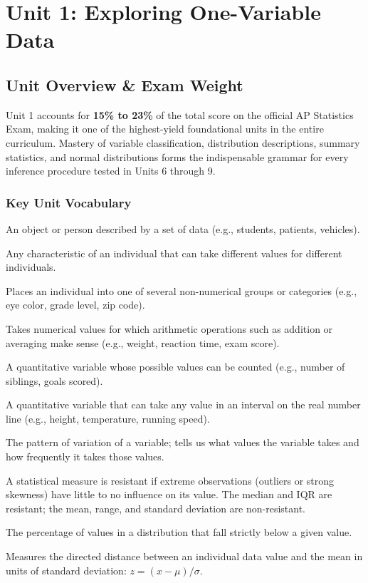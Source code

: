 ﻿%
\chapter{Unit 1: Exploring One-Variable Data}

\section{Unit Overview \& Exam Weight}
Unit 1 accounts for \textbf{15\% to 23\%} of the total score on the official AP Statistics Exam, making it one of the highest-yield foundational units in the entire curriculum. Mastery of variable classification, distribution descriptions, summary statistics, and normal distributions forms the indispensable grammar for every inference procedure tested in Units 6 through 9.

\subsection*{Key Unit Vocabulary}
\begin{description}[leftmargin=1.5em, style=nextline]
  \item[Individual:] An object or person described by a set of data (e.g., students, patients, vehicles).
  \item[Variable:] Any characteristic of an individual that can take different values for different individuals.
  \item[Categorical Variable:] Places an individual into one of several non-numerical groups or categories (e.g., eye color, grade level, zip code).
  \item[Quantitative Variable:] Takes numerical values for which arithmetic operations such as addition or averaging make sense (e.g., weight, reaction time, exam score).
  \item[Discrete Quantitative Variable:] A quantitative variable whose possible values can be counted (e.g., number of siblings, goals scored).
  \item[Continuous Quantitative Variable:] A quantitative variable that can take any value in an interval on the real number line (e.g., height, temperature, running speed).
  \item[Distribution:] The pattern of variation of a variable; tells us what values the variable takes and how frequently it takes those values.
  \item[Resistance:] A statistical measure is resistant if extreme observations (outliers or strong skewness) have little to no influence on its value. The median and IQR are resistant; the mean, range, and standard deviation are non-resistant.
  \item[Percentile:] The percentage of values in a distribution that fall strictly below a given value.
  \item[Z-Score (Standardized Value):] Measures the directed distance between an individual data value and the mean in units of standard deviation: $z = (x - \mu)/\sigma$.
\end{description}

